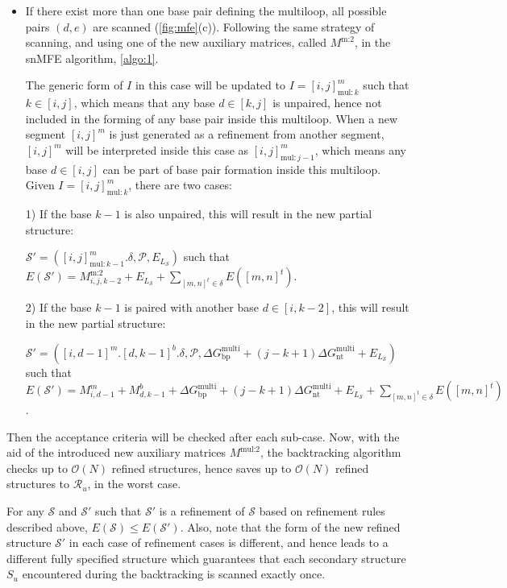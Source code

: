 \documentclass[11pt,letterpaper]{article}  \usepackage[margin=1in]{geometry}
\theoremstyle{definition}  \newtheorem{Definition}[theorem]{Definition}
\newcommand{\snMFE}{snMFE\xspace}
\begin{document}
\begin{enumerate}
\begin{itemize}
		
		\item  If there exist more than one  base pair defining the multiloop, all possible pairs $(d,e)$ are scanned (\cref{fig:mfe}(c)). Following the same strategy of scanning, and using one of the new auxiliary matrices, called $M^\text{m:2}$, in the \snMFE algorithm, \cref{algo:1}. 
		
		
		The generic form of $I$ in this case will be updated to $I = [i,j]^m_{\text{mul}:k}$ 	such that $k \in [i,j]$, which means that any base $d \in[k,j]$ is unpaired, hence not included in the forming of any base pair inside this multiloop.
		When a new segment $[i,j]^m$ is just generated as a refinement from another segment, 
		$[i,j]^m$ will be interpreted inside this case as $ [i,j]^m_{\text{mul}:j-1} $, which means any base $d \in [i,j]$ can be part of base pair formation inside this multiloop. 
		Given  $I = [i,j]^m_{\text{mul}:k}$, there are two cases:
		
		
		
		
		1) If the base $k-1$ is also unpaired, this will
		result in the new partial structure: 
		
		$\mathcal{S}' = ([i,j]^m_{\text{mul}:k-1}.\delta, \mathcal{P}, E_{L_{\mathcal{S}}})$ such that $E(\mathcal{S}') = M_{i,j,k-2}^\text{m:2} + E_{L_{\mathcal{S}}} + \sum \limits_{[m,n]^t \in \delta} E([m,n]^t)$. 
		
		2) If the base $k-1$ is paired with another base $d \in [i,k-2]$,  this will result in the new partial structure: 
		
		$\mathcal{S}' = ([i,d-1]^m.[d,k-1]^b.\delta, \mathcal{P},  \Delta G_\text{bp}^\text{multi} + (j-k + 1) \Delta G_\text{nt}^\text{multi} + E_{L_{\mathcal{S}}})$ such that $E(\mathcal{S}') =   M^m_{i,d-1} +  M^b_{d,k-1} + \Delta G_\text{bp}^\text{multi} + (j-k + 1)\Delta G_\text{nt}^\text{multi} +E_{L_{\mathcal{S}}} 
		+ \sum \limits_{[m,n]^t \in \delta} E([m,n]^t)$. 
		
		
	\end{itemize}
	
	Then the acceptance criteria will be checked after each sub-case. Now, with the aid of the introduced new auxiliary matrices $M^\text{mul:2}$, the backtracking algorithm   checks up to $\mathcal{O}(N)$ refined structures, hence saves up to  $\mathcal{O}(N)$ refined structures to $\mathcal{R}_u$, in the worst case.
	
\end{enumerate}

\begin{remark}
	For any $\mathcal{S}$ and  $\mathcal{S}'$ such that $\mathcal{S}'$ is a refinement of $\mathcal{S}$ based on refinement rules described above, $E(\mathcal{S}) \leq E(\mathcal{S}')$. Also, note that the form of the new refined structure $\mathcal{S}'$ in each case of refinement cases is different, and hence leads to a different fully specified structure which guarantees that each secondary structure $S_u$ encountered during the backtracking is scanned exactly once. 
\end{remark} 
\end{document}
